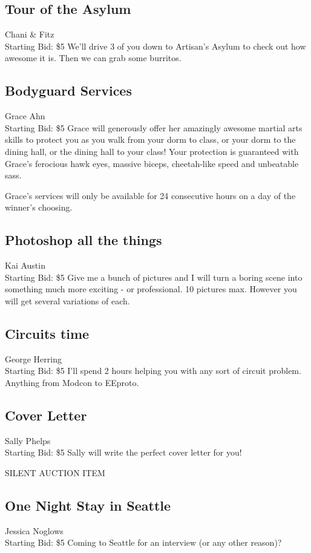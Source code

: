\documentclass[11pt]{article}
\begin{document}
\subsection{Tour of the Asylum}
Chani \& Fitz
\\
Starting Bid: \$5
\newline
We'll drive 3 of you down to Artisan's Asylum to check out how awesome it is. Then we can grab some burritos.
\subsection{Bodyguard Services}
Grace Ahn
\\
Starting Bid: \$5
\newline
Grace will generously offer her amazingly awesome martial arts skills to protect you as you walk from your dorm to class, or your dorm to the dining hall, or the dining hall to your class! Your protection is guaranteed with Grace's ferocious hawk eyes, massive biceps, cheetah-like speed and unbeatable sass. 

Grace's services will only be available for 24 consecutive hours on a day of the winner's choosing.
\subsection{Photoshop all the things}
Kai Austin
\\
Starting Bid: \$5
\newline
Give me a bunch of pictures and I will turn a boring scene into something much more exciting - or professional. 
10 pictures max. However you will get several variations of each.
\subsection{Circuits time}
George Herring
\\
Starting Bid: \$5
\newline
I'll spend 2 hours helping you with any sort of circuit problem.  Anything from Modcon to EEproto.
\subsection{Cover Letter}
Sally Phelps
\\
Starting Bid: \$5
\newline
Sally will write the perfect cover letter for you!

SILENT AUCTION ITEM
\subsection{One Night Stay in Seattle}
Jessica Noglows
\\
Starting Bid: \$5
\newline
Coming to Seattle for an interview (or any other reason)?
\end{document}
